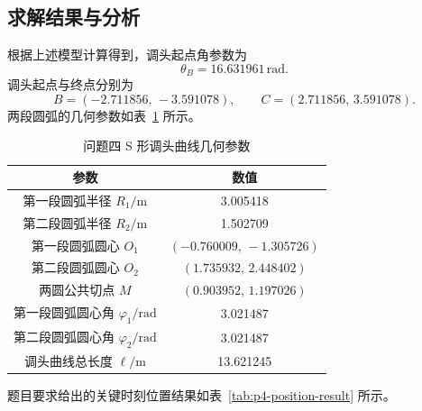 \subsection{求解结果与分析}

根据上述模型计算得到，调头起点角参数为
\begin{equation}
    \theta_B=16.631961\,\mathrm{rad}.
    \label{eq:p4-theta-result}
\end{equation}
调头起点与终点分别为
\begin{equation}
    B=(-2.711856,\,-3.591078),
    \qquad
    C=(2.711856,\,3.591078).
    \label{eq:p4-BC-result}
\end{equation}
两段圆弧的几何参数如表~\ref{tab:p4-arc-params} 所示。

\begin{table}[H]
    \centering
    \caption{问题四 S 形调头曲线几何参数}
    \label{tab:p4-arc-params}
    \begin{tabular}{c c}
        \toprule
        参数 & 数值 \\
        \midrule
        第一段圆弧半径 $R_1/\mathrm{m}$ & 3.005418 \\
        第二段圆弧半径 $R_2/\mathrm{m}$ & 1.502709 \\
        第一段圆弧圆心 $O_1$ & $(-0.760009,\,-1.305726)$ \\
        第二段圆弧圆心 $O_2$ & $(1.735932,\,2.448402)$ \\
        两圆公共切点 $M$ & $(0.903952,\,1.197026)$ \\
        第一段圆弧圆心角 $\varphi_1/\mathrm{rad}$ & 3.021487 \\
        第二段圆弧圆心角 $\varphi_2/\mathrm{rad}$ & 3.021487 \\
        调头曲线总长度 $\ell/\mathrm{m}$ & 13.621245 \\
        \bottomrule
    \end{tabular}
\end{table}

题目要求给出的关键时刻位置结果如表~\ref{tab:p4-position-result} 所示。

